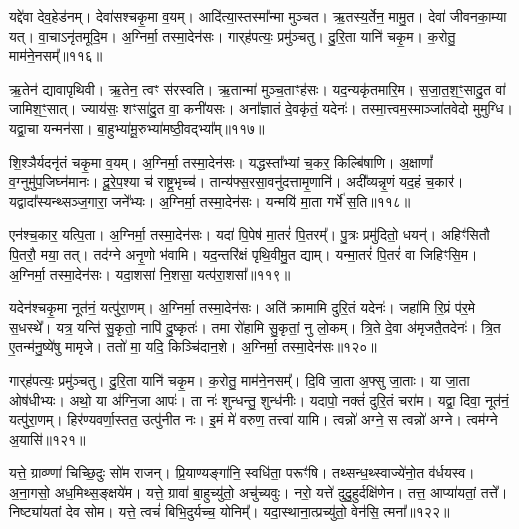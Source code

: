 यद्दे॑वा देव॒हेड॑नम्।
देवा॑सश्चकृ॒मा व॒यम्।
आदि॑त्या॒\-स्तस्मा᳚न्मा मुञ्चत।
ऋ॒तस्य॒र्तेन॒ मामु॒त।
देवा॑ जीवनका॒म्या यत्।
वा॒चा\-ऽनृ॑तमूदि॒म।
अ॒ग्निर्मा॒ तस्मा॒देन॑सः।
गार्‌\mbox{}ह॑पत्यः॒ प्रमु॑ञ्चतु।
दु॒रि॒ता यानि॑ चकृ॒म।
क॒रोतु॒ माम॑ने॒नसम्᳚॥११६॥

ऋ॒तेन॑ द्यावापृथिवी।
ऋ॒तेन॒ त्वꣳ स॑रस्वति।
ऋ॒तान्मा॑ मुञ्च॒ताꣳह॑सः।
यद॒न्यकृ॑तमारि॒म।
स॒जा॒त॒श॒ꣳ॒सादु॒त वा॑ जामिश॒ꣳ॒सात्।
ज्याय॑सः॒ शꣳसा॑दु॒त वा॒ कनी॑यसः।
अना᳚ज्ञातं दे॒वकृ॑तं॒ यदेनः॑।
तस्मा॒त्त्वम॒स्माञ्जा॑तवेदो मुमुग्धि।
यद्वा॒चा यन्मन॑सा।
बा॒हुभ्या॑मू॒रुभ्या॑मष्ठी॒वद्भ्या᳚म्॥११७॥

शि॒श्ञैर्यदनृ॑तं चकृ॒मा व॒यम्।
अ॒ग्निर्मा॒ तस्मा॒देन॑सः।
यद्धस्ता᳚भ्यां च॒कर॒ किल्बि॑षाणि।
अ॒क्षाणां᳚ व॒ग्नुमु॑प॒जिघ्न॑मानः।
दू॒रे॒प॒श्या च॑ राष्ट्र॒भृच्च॑।
तान्य॑फ्स॒रसा॒वनु॑दत्तामृ॒णानि॑।
अदी᳚व्यन्नृ॒णं यद॒हं च॒कार॑।
यद्वादा᳚स्यन्थ्सञ्ज॒गारा॒ जने᳚भ्यः।
अ॒ग्निर्मा॒ तस्मा॒देन॑सः।
यन्मयि॑ मा॒ता गर्भे॑ स॒ति॥११८॥

एन॑श्च॒कार॒ यत्पि॒ता।
अ॒ग्निर्मा॒ तस्मा॒देन॑सः।
यदा॑ पि॒पेष॑ मा॒तरं॑ पि॒तरम्᳚।
पु॒त्रः प्रमु॑दितो॒ धयन्॑।
अहिꣳ॑सितौ पि॒तरौ॒ मया॒ तत्।
तद॑ग्ने अनृ॒णो भ॑वामि।
यद॒न्तरि॑क्षं पृथि॒वीमु॒त द्याम्।
यन्मा॒तरं॑ पि॒तरं॑ वा जिहिꣳसि॒म।
अ॒ग्निर्मा॒ तस्मा॒देन॑सः।
यदा॒शसा॑ नि॒शसा॒ यत्प॑रा॒शसा᳚॥११९॥

यदेन॑श्चकृ॒मा नूत॑नं॒ यत्पु॑रा॒णम्।
अ॒ग्निर्मा॒ तस्मा॒देन॑सः।
अति॑ क्रामामि दुरि॒तं यदेनः॑।
जहा॑मि रि॒प्रं प॑र॒मे स॒धस्थे᳚।
यत्र॒ यन्ति॑ सु॒कृतो॒ नापि॑ दु॒ष्कृतः॑।
तमा रो॑हामि सु॒कृतां॒ नु लो॒कम्।
त्रि॒ते दे॒वा अ॑मृजतै॒तदेनः॑।
त्रि॒त ए॒तन्म॑नु॒ष्ये॑षु मामृजे।
ततो॑ मा॒ यदि॒ किञ्चि॑दान॒शे।
अ॒ग्निर्मा॒ तस्मा॒देन॑सः॥१२०॥

गार्‌\mbox{}ह॑पत्यः॒ प्रमु॑ञ्चतु।
दु॒रि॒ता यानि॑ चकृ॒म।
क॒रोतु॒ माम॑ने॒नसम्᳚।
दि॒वि जा॒ता अ॒फ्सु जा॒ताः।
या जा॒ता ओष॑धीभ्यः।
अथो॒ या अ॑ग्नि॒जा आपः॑।
ता नः॑ शुन्धन्तु॒ शुन्ध॑नीः।
यदापो॒ नक्तं॑ दुरि॒तं चरा॑म।
यद्वा॒ दिवा॒ नूत॑नं॒ यत्पु॑रा॒णम्।
हिर॑ण्यवर्णा॒स्तत॒ उत्पु॑नीत नः।
इ॒मं मे॑ वरुण॒ तत्त्वा॑ यामि।
त्वन्नो॑ अग्ने॒ स त्वन्नो॑ अग्ने।
त्वम॑ग्ने अ॒यासि॑॥१२१॥\anuvakamend[अ॒ने॒नस॑मष्ठी॒वद्भ्याꣳ॑ स॒ति प॑रा॒शसा॑\-ऽऽन॒शे᳚\-ऽग्निर्मा॒ तस्मा॒देन॑सः पुनीत न॒स्त्रीणि॑ च (यद्दे॑वा॒ देवा॑ ऋ॒तेन॑ सजातश॒ꣳ॒साद्यद्वा॒चा यद्धस्ता᳚भ्या॒मदी᳚व्यं॒ यन्मयि॑ मा॒ता यदा॑ पि॒पेष॒ यद॒न्तरि॑क्षं॒ यदा॒शसाऽति॑ क्रामामि त्रि॒ते दे॒वा दि॒वि जा॒ता अ॒फ्सु जा॒ता यदाप॑ इ॒मं मे॑ वरुण॒ तत्त्वा॑ यामि॒ त्वन्नो॑ अग्ने॒ स त्वन्नो॑ अग्ने॒ त्वम॑ग्ने अ॒यासि॑।
)]

यत्ते॒ ग्राव्ण्णा॑ चिच्छि॒दुः सो॑म राजन्।
प्रि॒याण्यङ्गा॑नि॒ स्वधि॑ता॒ परूꣳ॑षि।
तथ्सन्ध॒थ्स्वाज्ये॑नो॒त व॑र्धयस्व।
अ॒ना॒गसो॒ अध॒मिथ्स॒ङ्क्षये॑म।
यत्ते॒ ग्रावा॑ बा॒हुच्यु॑तो॒ अचु॑च्यवुः।
नरो॒ यत्ते॑ दुदु॒हुर्दक्षि॑णेन।
तत्त॒ आप्या॑यतां॒ तत्ते᳚।
निष्ट्या॑यतां देव सोम।
यत्ते॒ त्वचं॑ बिभि॒दुर्यच्च॒ योनिम्᳚।
यदा॒स्थाना॒त्प्रच्यु॑तो॒ वेन॑सि॒ त्मना᳚॥१२२॥

